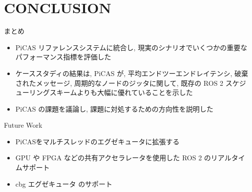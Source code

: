 
\section{CONCLUSION}
\label{sec: conclusion}

\begin{frame}{まとめ}
    \begin{itemize}
        \item PiCAS リファレンスシステムに統合し, 現実のシナリオでいくつかの重要なパフォーマンス指標を評価した
        \item ケーススタディの結果は, PiCAS が, 平均エンドツーエンドレイテンシ, 破棄されたメッセージ, 周期的なノードのジッタに関して, 既存の ROS 2 スケジューリングスキームよりも大幅に優れていることを示した
        \item PiCAS の課題を議論し, 課題に対処するための方向性を説明した
    \end{itemize}
\end{frame}

\begin{frame}{Future Work}
    \begin{itemize}
        \item PiCASをマルチスレッドのエグゼキュータに拡張する
        \item GPU や FPGA などの共有アクセラレータを使用した ROS 2 のリアルタイムサポート
        \item cbg エグゼキュータ \cite{yang2020exploring} のサポート
    \end{itemize}
\end{frame}
